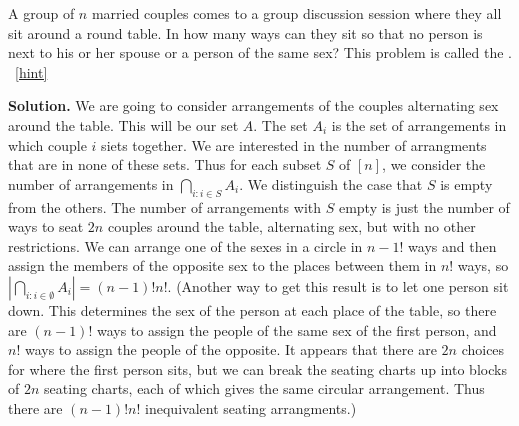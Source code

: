 \documentclass{book}
\begin{document}
\setcounter{project}{227}
\addtocounter{project}{-1}
\begin{activity}[]\label{activity-220}
\hypertarget{p-1264}{}%
A group of \(n\) married couples comes to a group discussion session where they all sit around a round table. In how many ways can they sit so that no person is next to his or her spouse or a person of the same sex? This problem is called the .%
~\hfill{\tiny\hyperlink{a-227}{[hint]}\hypertarget{q-227}{}}\par\smallskip%
\noindent\textbf{Solution.}\hypertarget{solution-154}{}\quad%
\hypertarget{p-1267}{}%
We are going to consider arrangements of the couples alternating sex around the table. This will be our set \(A\). The set \(A_i\) is the set of arrangements in which couple \(i\) siets together. We are interested in the number of arrangments that are in none of these sets. Thus for each subset \(S\) of \([n]\), we consider the number of arrangements in \(\displaystyle\bigcap_{i\colon i\in S} A_i\). We distinguish the case that \(S\) is empty from the others. The number of arrangements with \(S\) empty is just the number of ways to seat \(2n\) couples around the table, alternating sex, but with no other restrictions. We can arrange one of the sexes in a circle in \(n-1!\) ways and then assign the members of the opposite sex to the places between them in \(n!\) ways, so \(\displaystyle \left|\bigcap_{i\colon i\in \emptyset} A_i \right| = (n-1)!n!\). (Another way to get this result is to let one person sit down. This determines the sex of the person at each place of the table, so there are \((n-1)!\) ways to assign the people of the same sex of the first person, and \(n!\) ways to assign the people of the opposite. It appears that there are \(2n\) choices for where the first person sits, but we can break the seating charts up into blocks of \(2n\) seating charts, each of which gives the same circular arrangement. Thus there are \((n-1)!n!\) inequivalent seating arrangments.)%
\par
\hypertarget{p-1268}{}%

\end{activity}
\end{document}
